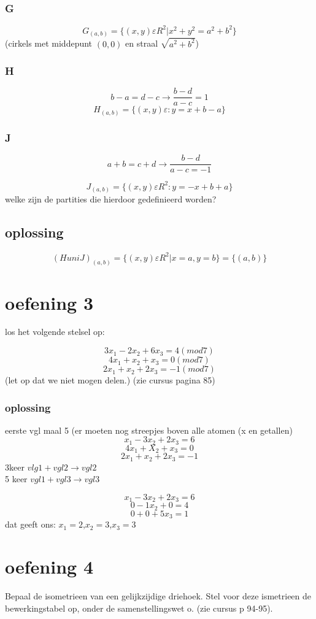 \documentclass[12pt,a4paper]{article}
\begin{document}
\subsubsection*{G}

\[
G_{(a,b)}=\{(x,y) \varepsilon R^2|x^2+y^2=a^2+b^2\}
\]
(cirkels met middepunt $(0,0)$ en straal $\sqrt{a^2+b^2}$)

\subsubsection*{H}

\[
b-a=d-c \rightarrow \frac{b-d}{a-c}=1
\]
\[
H_{(a,b)}=\{(x,y) \varepsilon : y=x+b-a\}
\]

\subsubsection*{J}


\[
a+b=c+d \rightarrow \frac{b-d}{a-c	=-1}
\]

\[
J_{(a,b)}=\{(x,y) \varepsilon R^2: y=-x+b+a\}
\]
welke zijn de partities die hierdoor gedefinieerd worden?

\subsection*{oplossing}
\[
(H uni J)_{(a,b)} =\{(x,y) \varepsilon R^2| x=a,y=b\}=\{(a,b)\}
\]

\section{oefening 3}
los het volgende stelsel op:

\[
3x_1-2x_2+6x_3=4 (mod7)
\]
\[
4x_1+x_2+x_3=0 (mod 7)
\]
\[
2x_1+x_2+2x_3=-1(mod 7)
\]
(let op dat we niet mogen delen.) (zie cursus pagina 85)
\subsubsection*{oplossing}
eerste vgl maal 5 (er moeten nog streepjes boven alle atomen (x en getallen)
\[
x_1-3x_2+2x_3=6
\]
\[
4x_1 +X_2+x_3=0
\]
\[
2x_1 +x_2+2x_3=-1
\]
3keer $vlg1+vgl2 \rightarrow vgl2$ 
\\
5 keer $vgl1+vgl3 \rightarrow vgl3$

\[
x_1-3x_2+2x_3=6
\]
\[
0-1x_2+0=4
\]
\[
0+0+ 5x_3=1
\]
dat geeft ons: $x_1=2$,$x_2=3$,$x_3=3$

\section{oefening 4}
Bepaal de isometrieen van een gelijkzijdige driehoek. Stel voor deze ismetrieen de bewerkingstabel op, onder de samenstellingswet o.
(zie cursus p 94-95).
\end{document}
